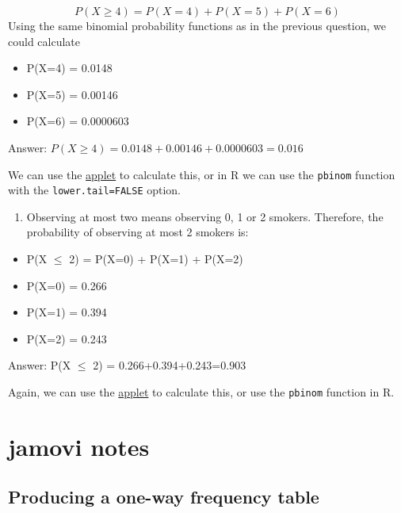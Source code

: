 \documentclass[
  a4paper,
]{memoir}
\providecommand{\tightlist}{%
  \setlength{\itemsep}{0pt}\setlength{\parskip}{0pt}}
\begin{document}
\[ P(X \ge 4) = P(X=4) + P(X=5) + P(X=6) \] Using the same binomial
probability functions as in the previous question, we could calculate

\begin{itemize}
\tightlist
\item
  P(X=4) = 0.0148
\item
  P(X=5) = 0.00146
\item
  P(X=6) = 0.0000603
\end{itemize}

Answer: \(P(X \ge 4) = 0.0148 + 0.00146 + 0.0000603 = 0.016\)

We can use the \href{https://mabognar.github.io/apps/bin.html}{applet}
to calculate this, or in R we can use the \texttt{pbinom} function with
the \texttt{lower.tail=FALSE} option.

\begin{enumerate}
\def\labelenumi{\alph{enumi})}
\setcounter{enumi}{2}
\tightlist
\item
  Observing at most two means observing 0, 1 or 2 smokers. Therefore,
  the probability of observing at most 2 smokers is:
\end{enumerate}

\begin{itemize}
\tightlist
\item
  P(X \(\le\) 2) = P(X=0) + P(X=1) + P(X=2)
\item
  P(X=0) = 0.266
\item
  P(X=1) = 0.394
\item
  P(X=2) = 0.243
\end{itemize}

Answer: P(X \(\le\) 2) = 0.266+0.394+0.243=0.903

Again, we can use the
\href{https://mabognar.github.io/apps/bin.html}{applet} to calculate
this, or use the \texttt{pbinom} function in R.

\newpage{}


\chapter*{jamovi notes}\label{jamovi-notes}


\section{Producing a one-way frequency
table}\label{producing-a-one-way-frequency-table}
\end{document}
